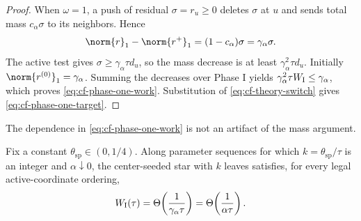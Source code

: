 \begin{proof}
When \(\omega=1\), a push of residual \(\sigma=r_u\geq0\) deletes \(\sigma\) at
\(u\) and sends total mass \(c_\alpha \sigma\) to its neighbors.  Hence
\begin{equation}
    \norm{r}_1-\norm{r^+}_1
    =(1-c_\alpha)\sigma
    =\gamma_\alpha \sigma.
    \label{eq:cf-phase-one-mass-drop}
\end{equation}
The active test gives \(\sigma\geq\gamma_\alpha\tau d_u\), so the mass decrease is
at least \(\gamma_\alpha^2\tau d_u\).  Initially
\(\norm{r^{(0)}}_1=\gamma_\alpha\).  Summing the decreases over Phase I yields
\(\gamma_\alpha^2\tau W_{\rm I}\leq\gamma_\alpha\), which proves
\cref{eq:cf-phase-one-work}.  Substitution of
\cref{eq:cf-theory-switch} gives \cref{eq:cf-phase-one-target}.
\end{proof}

The dependence in \cref{eq:cf-phase-one-work} is not an artifact of the
mass argument.

\begin{proposition}
\label{prop:cf-phase-one-star}
Fix a constant \(\theta_{\mathrm{sp}}\in(0,1/4)\). Along parameter sequences
for which \(k=\theta_{\mathrm{sp}}/\tau\) is an integer and
\(\alpha\downarrow0\), the center-seeded star with \(k\) leaves satisfies,
for every legal active-coordinate ordering,
\begin{equation}
    W_{\rm I}(\tau)
    =\Theta\!\left(\frac{1}{\gamma_\alpha\tau}\right)
    =\Theta\!\left(\frac{1}{\alpha\tau}\right).
    \label{eq:cf-phase-one-star-tight}
\end{equation}
\end{proposition}

